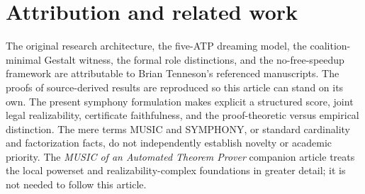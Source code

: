 \documentclass[11pt,letterpaper]{article}
\theoremstyle{definition}
\theoremstyle{remark}
\begin{document}
\section*{Attribution and related work}
The original research architecture, the five-ATP dreaming model, the coalition-minimal Gestalt witness, the formal role distinctions, and the no-free-speedup framework are attributable to Brian Tenneson's referenced manuscripts. The proofs of source-derived results are reproduced so this article can stand on its own. The present symphony formulation makes explicit a structured score, joint legal realizability, certificate faithfulness, and the proof-theoretic versus empirical distinction. The mere terms MUSIC and SYMPHONY, or standard cardinality and factorization facts, do not independently establish novelty or academic priority. The \emph{MUSIC of an Automated Theorem Prover} companion article \cite{tenneson-music} treats the local powerset and realizability-complex foundations in greater detail; it is not needed to follow this article.

\begingroup\footnotesize
\end{document}
